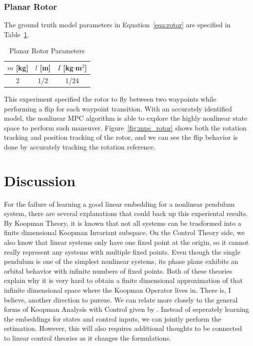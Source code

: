 \documentclass[10pt,twocolumn]{article}
\begin{document}
\subsubsection{Planar Rotor}

The ground truth model parameters in Equation~\ref{eqa:rotor} are specified in
Table~\ref{tbl:rotor_params}.
\begin{table}[h]
  \centering
  \begin{tabular}{ccc}
    \toprule
    $m$ [kg] & $l$ [m] & $I$ [kg$\cdot$m$^2$] \\
    \midrule
    2 & 1/2 & 1/24 \\
    \bottomrule
  \end{tabular}
  \caption{Planar Rotor Parameters}
  \label{tbl:rotor_params}
\end{table}
This experiment specified the rotor to fly between two waypoints while performing a
flip for each waypoint transition. With an accurately identified model, the nonlinear MPC
algorithm is able to explore the highly nonlinear state space to perform such maneuver.
Figure~\ref{fig:mpc_rotor} shows both the rotation tracking and position tracking of the rotor,
and we can see the flip behavior is done by accurately tracking the rotation reference.

\section{Discussion}

For the failure of learning a good linear embedding for a nonlinear pendulum system, there
are several explanations that could back up this experiental results. By Koopman Theory, it is
known that not all systems can be trasformed into a finite dimensional Koopman Invariant subspace.
On the Control Theory side, we also know that linear systems only have one fixed point at
the origin, so it cannot really represent any systems with multiple fixed points. Even though
the single pendulum is one of the simplest nonlinear systems, its phase plane exhibits an
orbital behavior with infinite numbers of fixed points. Both of these theories explain why it
is very hard to obtain a finite dimensional approximation of that infinite dimensional space
where the Koopman Operator lives in. There is, I believe, another direction to pursue.
We can relate more closely to the general forms of Koopman Analysis with Control given by
\cite{generalkoopman}. Instead of seperately learning the embeddings for states and control
inputs, we can jointly perform the estimation. However, this will also requires additional
thoughts to be connected to linear control theories as it changes the formulations.\\
\end{document}
